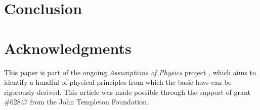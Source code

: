 \documentclass[10pt,twocolumn, nofootinbib]{revtex4-2}
\begin{document}
\section{Conclusion}



\section*{Acknowledgments}
This paper is part of the ongoing \textit{Assumptions of Physics} project \cite{aop-book}, which aims to identify a handful of physical principles from which the basic laws can be rigorously derived. This article was made possible through the support of grant \#62847 from the John Templeton Foundation.




\newcommand{\pj}[1] {\underbar{$#1$}}
\end{document}
